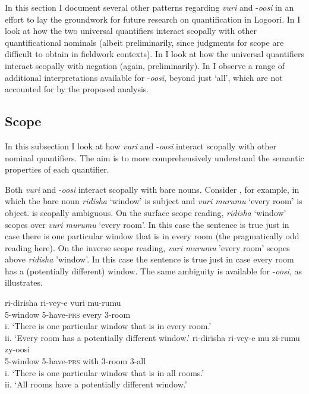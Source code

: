\documentclass[output=paper]{langsci/langscibook}
\begin{document}
In this section I document several other patterns regarding \textit{vuri} and -\textit{oosi} in an effort to lay the groundwork for future research on quantification in Logoori. In  I look at how the two universal quantifiers interact scopally with other quantificational nominals (albeit preliminarily, since judgments for scope are difficult to obtain in fieldwork contexts). In  I look at how the universal quantifiers interact scopally with negation (again, preliminarily). In  I observe a range of additional interpretations available for -\textit{oosi}, beyond just ‘all’, which are not accounted for by the proposed analysis.

\subsection{Scope}\label{sec:landman:4.1} 

In this subsection I look at how \textit{vuri} and -\textit{oosi} interact scopally with other nominal quantifiers. The aim is to more comprehensively understand the semantic properties of each quantifier.

Both \textit{vuri} and -\textit{oosi} interact scopally with bare nouns. Consider , for example, in which the bare noun \textit{ridisha} ‘window’ is subject and \textit{vuri murumu} ‘every room’ is object.  is scopally ambiguous. On the surface scope reading, \textit{ridisha} ‘window’ scopes over \textit{vuri murumu} ‘every room’. In this case the sentence is true just in case there is one particular window that is in every room (the pragmatically odd reading here). On the inverse scope reading, \textit{vuri murumu} 'every room' scopes above \textit{ridisha} 'window'. In this case the sentence is true just in case every room has a (potentially different) window. The same ambiguity is available for -\textit{oosi}, as  illustrates.

\ea\label{ex:landman:26} 
\ea\label{ex:landman:26a}
\gll ri-dirisha  ri-vey-e  vuri  mu-rumu  \\
     5-window  5-have-\textsc{prs}  every  3-room\\
\glt i. ‘There is one particular window that is in every room.’  \\
ii. ‘Every room has a potentially different window.’  
\ex\label{ex:landman:26b}
\gll ri-dirisha  ri-vey-e  mu  zi-rumu  zy-oosi\\
     5-window  5-have-\textsc{prs}  with  3-room  3-all\\
\glt i. ‘There is one particular window that is in all rooms.’ \\
ii. ‘All rooms have a potentially different window.’        
\z
\z
\end{document}
